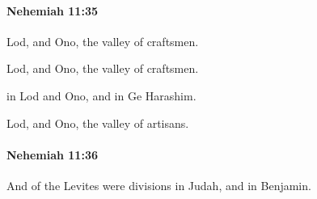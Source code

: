 		\paragraph{Nehemiah 11:35} %
			\label{NEHEMIAH-11-35}

			Lod, and Ono, the valley of craftsmen.

			\begin{versebox}
					\item[BHS] 
					\item[ASV] Lod, and Ono, the valley of craftsmen.
					\item[NIV] in Lod and Ono, and in Ge Harashim.
					\item[NRSV] Lod, and Ono, the valley of artisans.
			\end{versebox}

		\paragraph{Nehemiah 11:36} %
			\label{NEHEMIAH-11-36}

			And of the Levites were divisions in Judah, and in Benjamin.

